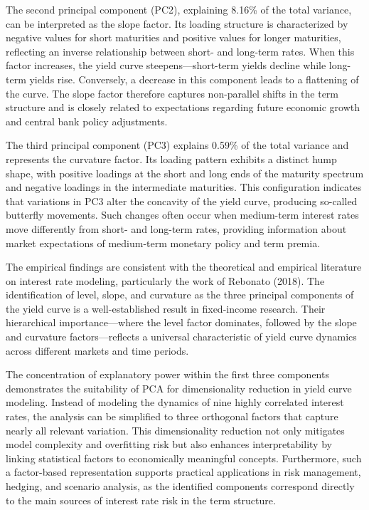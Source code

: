 The second principal component (PC2), explaining 8.16\% of the total variance, can be interpreted as the slope factor. Its loading structure is characterized by negative values for short maturities and positive values for longer maturities, reflecting an inverse relationship between short- and long-term rates. When this factor increases, the yield curve steepens—short-term yields decline while long-term yields rise. Conversely, a decrease in this component leads to a flattening of the curve. The slope factor therefore captures non-parallel shifts in the term structure and is closely related to expectations regarding future economic growth and central bank policy adjustments.

The third principal component (PC3) explains 0.59\% of the total variance and represents the curvature factor. Its loading pattern exhibits a distinct hump shape, with positive loadings at the short and long ends of the maturity spectrum and negative loadings in the intermediate maturities. This configuration indicates that variations in PC3 alter the concavity of the yield curve, producing so-called butterfly movements. Such changes often occur when medium-term interest rates move differently from short- and long-term rates, providing information about market expectations of medium-term monetary policy and term premia.

The empirical findings are consistent with the theoretical and empirical literature on interest rate modeling, particularly the work of Rebonato (2018). The identification of level, slope, and curvature as the three principal components of the yield curve is a well-established result in fixed-income research. Their hierarchical importance—where the level factor dominates, followed by the slope and curvature factors—reflects a universal characteristic of yield curve dynamics across different markets and time periods.

The concentration of explanatory power within the first three components demonstrates the suitability of PCA for dimensionality reduction in yield curve modeling. Instead of modeling the dynamics of nine highly correlated interest rates, the analysis can be simplified to three orthogonal factors that capture nearly all relevant variation. This dimensionality reduction not only mitigates model complexity and overfitting risk but also enhances interpretability by linking statistical factors to economically meaningful concepts. Furthermore, such a factor-based representation supports practical applications in risk management, hedging, and scenario analysis, as the identified components correspond directly to the main sources of interest rate risk in the term structure.

